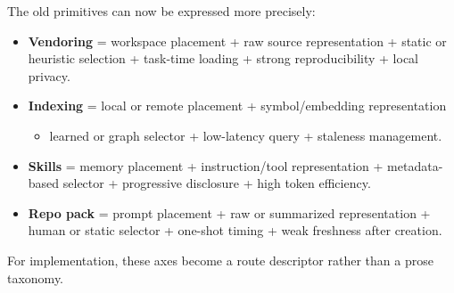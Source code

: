 \documentclass[
  11pt,
  letterpaper,
  numbers=noendperiod,
  parskip=half]{scrartcl}
\providecommand{\tightlist}{%
  \setlength{\itemsep}{0pt}\setlength{\parskip}{0pt}}
\begin{document}
The old primitives can now be expressed more precisely:

\begin{itemize}
\tightlist
\item
  \textbf{Vendoring} = workspace placement + raw source representation +
  static or heuristic selection + task-time loading + strong
  reproducibility + local privacy.
\item
  \textbf{Indexing} = local or remote placement + symbol/embedding
  representation

  \begin{itemize}
  \tightlist
  \item
    learned or graph selector + low-latency query + staleness
    management.
  \end{itemize}
\item
  \textbf{Skills} = memory placement + instruction/tool representation +
  metadata-based selector + progressive disclosure + high token
  efficiency.
\item
  \textbf{Repo pack} = prompt placement + raw or summarized
  representation + human or static selector + one-shot timing + weak
  freshness after creation.
\end{itemize}

For implementation, these axes become a route descriptor rather than a
prose taxonomy.
\end{document}
